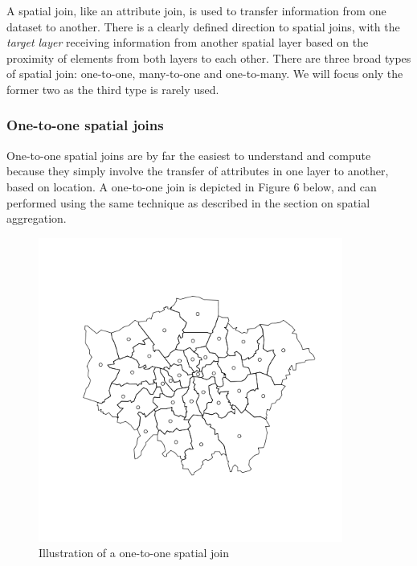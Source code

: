 \documentclass[]{article}
\let\Oldincludegraphics\includegraphics
\renewcommand{\includegraphics}[1]{\Oldincludegraphics[width=10cm]{#1}}
\begin{document}
A spatial join, like an attribute join, is used to transfer information
from one dataset to another. There is a clearly defined direction to
spatial joins, with the \emph{target layer} receiving information from
another spatial layer based on the proximity of elements from both
layers to each other. There are three broad types of spatial join:
one-to-one, many-to-one and one-to-many. We will focus only the former
two as the third type is rarely used.

\subsubsection{One-to-one spatial joins}

One-to-one spatial joins are by far the easiest to understand and
compute because they simply involve the transfer of attributes in one
layer to another, based on location. A one-to-one join is depicted in
Figure 6 below, and can performed using the same technique as described
in the section on spatial aggregation.

\begin{figure}[htbp]
\centering
\includegraphics{figure/Illustration_of_a_one-to-one_spatial_join_.png}
\caption{Illustration of a one-to-one spatial join}
\end{figure}
\end{document}
